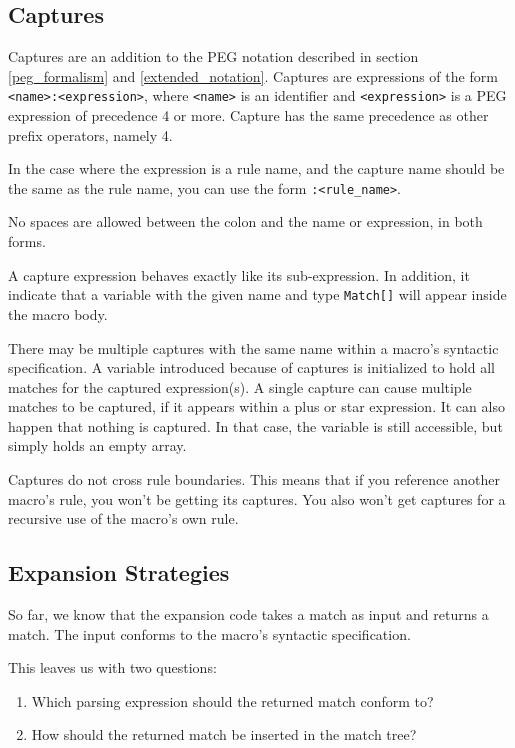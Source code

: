 \subsection{Captures}
\label{captures_manual}

Captures are an addition to the PEG notation described in section
\ref{peg_formalism} and \ref{extended_notation}. Captures are expressions of the
form \texttt{<name>:<expression>}, where \texttt{<name>} is an identifier and
\texttt{<expression>} is a PEG expression of precedence 4 or more. Capture has
the same precedence as other prefix operators, namely 4.

In the case where the expression is a rule name, and the capture name should be
the same as the rule name, you can use the form \texttt{:<rule_name>}.

No spaces are allowed between the colon and the name or expression, in both
forms.

A capture expression behaves exactly like its sub-expression. In addition, it
indicate that a variable with the given name and type \texttt{Match[]} will
appear inside the macro body.

There may be multiple captures with the same name within a macro's syntactic
specification. A variable introduced because of captures is initialized to hold
all matches for the captured expression(s). A single capture can cause multiple
matches to be captured, if it appears within a plus or star expression. It can
also happen that nothing is captured. In that case, the variable is still
accessible, but simply holds an empty array.

Captures do not cross rule boundaries. This means that if you reference another
macro's rule, you won't be getting its captures. You also won't get captures for
a recursive use of the macro's own rule.

\subsection{Expansion Strategies}
\label{expansion_strategies}

So far, we know that the expansion code takes a match as input and returns a
match.  The input conforms to the macro's syntactic specification.

This leaves us with
two questions:

\begin{enumerate}
\item Which parsing expression should the returned match conform to?
\item How should the returned match be inserted in the match tree?
\end{enumerate}

